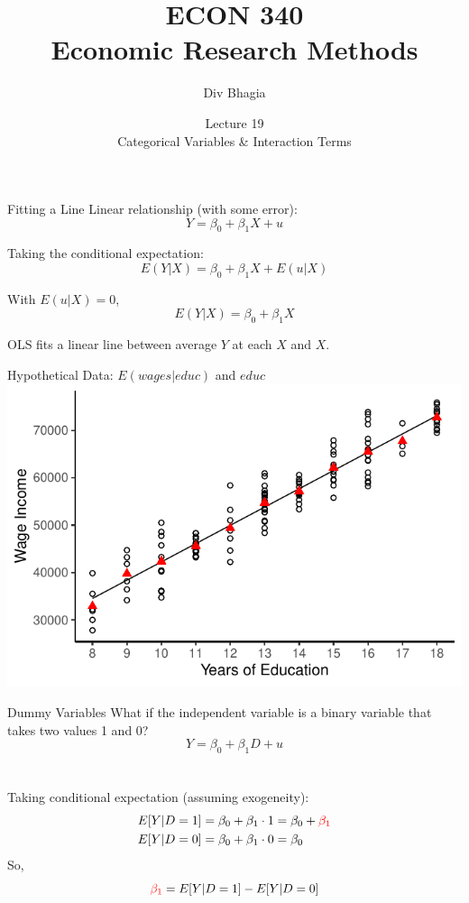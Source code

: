 \documentclass{./../div_teaching_slides}
\begin{document}
\title{ECON 340 \\ Economic Research Methods}
\author{Div Bhagia}
\date{Lecture 19 \\ Categorical Variables \& Interaction Terms}

\begin{frame}
\maketitle
\end{frame}


\begin{frame}{Fitting a Line}
Linear relationship (with some error):
$$ Y = \beta_0 + \beta_1 X + u  $$

Taking the conditional expectation:
$$ E(Y | X) =  \beta_0 + \beta_1 X + E(u | X)  $$

With $E(u | X)=0$, 
$$ E(Y | X) =  \beta_0 + \beta_1 X   $$

OLS fits a linear line between average $Y$ at each $X$ and $X$. 
\end{frame}

\begin{frame}{Hypothetical Data: $E(wages|educ)$ and $educ$}
\centering \vspace{-0.5em}
\includegraphics{./../../output/lrm_mean_fit.pdf}
\end{frame}

\begin{frame}{Dummy Variables}
What if the independent variable is a binary variable that takes two values 1 and 0?  
$$ Y = \beta_0 + \beta_1 D + u  $$ \\~\\
Taking conditional expectation (assuming exogeneity):
\begin{align*}
	E[Y | D=1] &= \beta_0 + \beta_1 \cdot 1  = \beta_0 + \textcolor{red}{\beta_1} \\
	E[Y | D=0] &= \beta_0 + \beta_1 \cdot 0 = \beta_0 
\end{align*}
So, $$\textcolor{red}{\beta_1} = E[Y | D=1]-E[Y | D=0] $$  
\end{frame}
\end{document}
